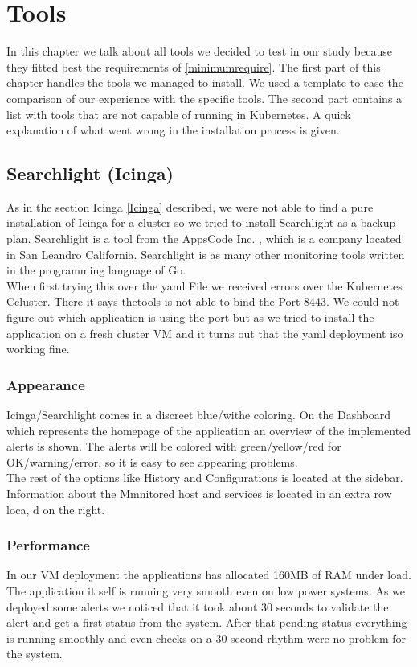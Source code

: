  
\chapter{Tools} 
In this chapter we talk about all tools we decided to test in our study because they fitted best the requirements of \cref{minimumrequire}. The first part of this chapter handles the tools we managed to install. We used a template to ease the comparison of our experience with the specific tools. The second part contains a list with tools that are not capable of running in Kubernetes. A quick explanation of what went wrong in the installation process is given.


\section{Searchlight (Icinga)}
\label{searchlight}
As in the section Icinga \ref{Icinga} described, we were not able to find a pure installation of Icinga for a cluster so we tried to install Searchlight as a backup plan.
Searchlight is a tool from the AppsCode Inc. \cite{appscode}, which is a company located in San Leandro California. 
Searchlight is as many other monitoring tools written in the programming language of Go.
\\
When first trying this over the yaml File we received errors over the Kubernetes Ccluster. There it says thetools is not able to bind the Port 8443. We could not figure out which application is using the port but as we tried to install the application on a fresh cluster VM and it turns out that the yaml deployment iso working fine.               \subsection{Appearance}
Icinga/Searchlight comes in a  discreet blue/withe coloring. On the Dashboard which represents the homepage of the application an overview of the implemented alerts is shown. The alerts will be colored with green/yellow/red for OK/warning/error, so it is easy to see appearing problems.\\
 The rest of the options like History and Configurations is located at the sidebar. Information about the Mmnitored host and services is located in an extra row loca, d on the right.
\subsection{Performance}
In our VM deployment the applications has allocated 160MB of RAM under load. The application it self is running very smooth even on low power systems. As we deployed some alerts we noticed that it took about 30 seconds to validate the alert and get a first status from the system. After that pending status everything is running smoothly and even checks on a 30 second rhythm were no problem for the system.

